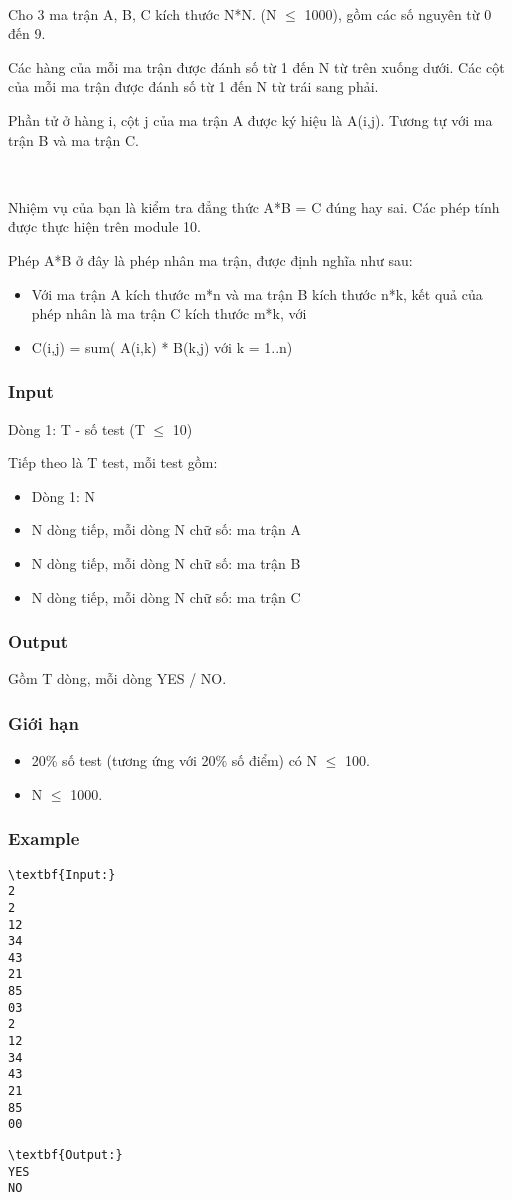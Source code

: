 

 

Cho 3 ma trận A, B, C kích thước N*N. (N  $\le$  1000), gồm các số nguyên từ 0 đến 9.

Các hàng của mỗi ma trận được đánh số từ 1 đến N từ trên xuống dưới. Các cột của mỗi ma trận được đánh số từ 1 đến N từ trái sang phải.

Phần tử ở hàng i, cột j của ma trận A được ký hiệu là A(i,j). Tương tự với ma trận B và ma trận C.

 

Nhiệm vụ của bạn là kiểm tra đẳng thức A*B = C đúng hay sai. Các phép tính được thực hiện trên module 10.

Phép A*B ở đây là phép nhân ma trận, được định nghĩa như sau:
\begin{itemize}
	\item Với ma trận A kích thước m*n và ma trận B kích thước n*k, kết quả của phép nhân là ma trận C kích thước m*k, với
	\item C(i,j) = sum( A(i,k) * B(k,j) với k = 1..n)
\end{itemize}

\subsubsection{Input}

Dòng 1: T - số test (T  $\le$  10)

Tiếp theo là T test, mỗi test gồm:
\begin{itemize}
	\item Dòng 1: N
	\item N dòng tiếp, mỗi dòng N chữ số: ma trận A
	\item N dòng tiếp, mỗi dòng N chữ số: ma trận B
	\item N dòng tiếp, mỗi dòng N chữ số: ma trận C
\end{itemize}

\subsubsection{Output}

Gồm T dòng, mỗi dòng YES / NO.

\subsubsection{Giới hạn}
\begin{itemize}
	\item 20\% số test (tương ứng với 20\% số điểm) có N  $\le$  100.
	\item N  $\le$  1000.
\end{itemize}

\subsubsection{Example}
\begin{verbatim}
\textbf{Input:}
2
2
12
34
43
21
85
03
2
12
34
43
21
85
00\end{verbatim}
\begin{verbatim}
\textbf{Output:}
YES
NO\end{verbatim}
